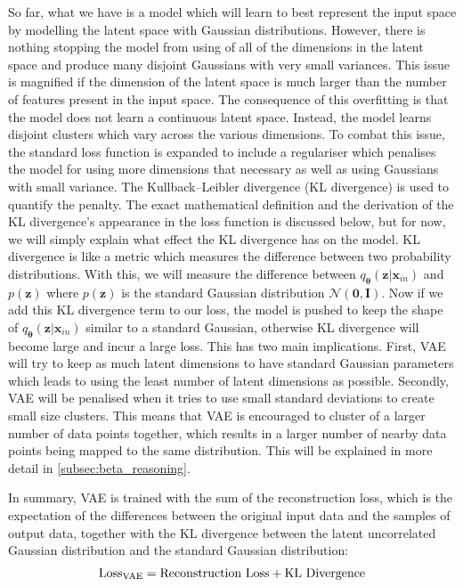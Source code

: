             So far, what we have is a model which will learn to best represent the input space by modelling the latent space with Gaussian distributions. However, there is nothing stopping the model from using of all of the dimensions in the latent space and produce many disjoint Gaussians with very small variances. This issue is magnified if the dimension of the latent space is much larger than the number of features present in the input space. The consequence of this overfitting is that the model does not learn a continuous latent space. Instead, the model learns disjoint clusters which vary across the various dimensions. To combat this issue, the standard loss function is expanded to include a regulariser which penalises the model for using more dimensions that necessary as well as using Gaussians with small variance.  The Kullback–Leibler divergence \citep{kullback1951information}(KL divergence) is used to quantify the penalty. The exact mathematical definition and the derivation of the KL divergence's appearance in the loss function is discussed below, but for now, we will simply explain what effect the KL divergence has on the model. KL divergence is like a metric which measures the difference between two probability distributions. With this, we will measure the difference between $q_{\bm{\theta}}(\bm{z}|\bm{x}_{in})$ and $p(\bm{z})$ where $p(\bm{z})$ is the standard Gaussian distribution $\mathcal{N}(\bm{0}, \bm{I})$. Now if we add this KL divergence term to our loss, the model is pushed to keep the shape of $q_{\bm{\theta}}(\bm{z}|\bm{x}_{in})$ similar to a standard Gaussian, otherwise KL divergence will become large and incur a large loss. This has two main implications. First, VAE will try to keep as much latent dimensions to have standard Gaussian parameters which leads to using the least number of latent dimensions as possible. Secondly, VAE will be penalised when it tries to use small standard deviations to create small size clusters. This means that VAE is encouraged to cluster of a larger number of data points together, which results in a larger number of nearby data points being mapped to the same distribution. This will be explained in more detail in \ref{subsec:beta_reasoning}.
            
            In summary, VAE is trained with the sum of the reconstruction loss, which is the expectation of the differences between the original input data and the samples of output data, together with the KL divergence between the latent uncorrelated Gaussian distribution and the standard Gaussian distribution:
            \begin{equation}
                \text{Loss\textsubscript{VAE}} = \text{Reconstruction Loss} + \text{KL Divergence}
                \label{eqn:loss_vae}
            \end{equation}
            
